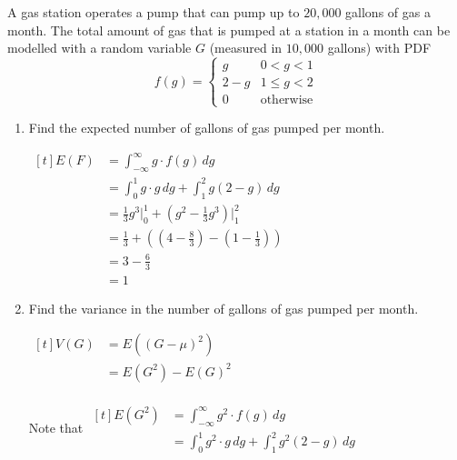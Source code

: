 \begin{example}
    A gas station operates a pump that can pump up to $20,000$ gallons of gas a month. The total amount of gas that is pumped at a station in a month can be modelled with a random variable $G$ (measured in $10,000$ gallons) with PDF $$f(g) = \begin{cases} g & 0 < g < 1 \\ 2 - g & 1 \le g < 2 \\ 0 & \text{otherwise} \end{cases}$$

    \begin{enumerate}[label=\alph*)]
        \item Find the expected number of gallons of gas pumped per month.
        
        $\begin{aligned}[t]
            E(F) & = \int_{-\infty}^\infty g \cdot f(g) \,dg \\
            & = \int_0^1 g \cdot g \,dg + \int_1^2 g(2 - g) \,dg \\
            & = \frac{1}{3} g^3 \bigg|_0^1 + \left( g^2 - \frac{1}{3}g^3 \right) \bigg|_1^2 \\
            & = \frac{1}{3} + \left( \left( 4 - \frac{8}{3} \right) - \left( 1 - \frac{1}{3} \right) \right) \\
            & = 3 - \frac{6}{3} \\
            & = 1
        \end{aligned}$

        \item Find the variance in the number of gallons of gas pumped per month.
        
        $\begin{aligned}[t]
            V(G) & = E((G - \mu)^2) \\
                 & = E(G^2) - E(G)^2 \\
        \end{aligned}$

        Note that $\begin{aligned}[t]
            E(G^2) & = \int_{-\infty}^\infty g^2 \cdot f(g) \,dg \\
            & = \int_0^1 g^2 \cdot g \,dg + \int_1^2 g^2 (2 - g) \,dg
        \end{aligned}$
    \end{enumerate}
\end{example}